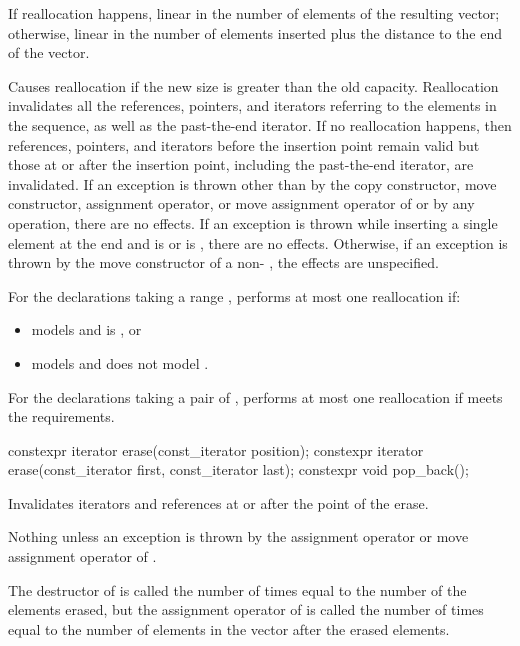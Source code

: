 \begin{itemdescr}
\pnum
\complexity
If reallocation happens,
linear in the number of elements of the resulting vector;
otherwise,
linear in the number of elements inserted plus the distance
to the end of the vector.

\pnum
\remarks
Causes reallocation if the new size is greater than the old capacity.
Reallocation invalidates all the references, pointers, and iterators
referring to the elements in the sequence, as well as the past-the-end iterator.
If no reallocation happens, then
references, pointers, and iterators
before the insertion point remain valid
but those at or after the insertion point,
including the past-the-end iterator,
are invalidated.
If an exception is thrown other than by
the copy constructor, move constructor,
assignment operator, or move assignment operator of
 or by any  operation,
there are no effects.
If an exception is thrown while inserting a single element at the end and
 is  or 
is , there are no effects.
Otherwise, if an exception is thrown by the move constructor of a non-
, the effects are unspecified.

\pnum
For the declarations taking a range ,
performs at most one reallocation if:
\begin{itemize}
\item
{} models  and
 is , or
\item
{} models  and
 does not model .
\end{itemize}
For the declarations taking a pair of ,
performs at most one reallocation if
 meets the  requirements.
\end{itemdescr}

%
\begin{itemdecl}
constexpr iterator erase(const_iterator position);
constexpr iterator erase(const_iterator first, const_iterator last);
constexpr void pop_back();
\end{itemdecl}

\begin{itemdescr}
\pnum
\effects
Invalidates iterators and references at or after the point of the erase.

\pnum
\throws
Nothing unless an exception is thrown by the
assignment operator or move assignment operator of
.

\pnum
\complexity
The destructor of  is called the number of times equal to the
number of the elements erased, but the assignment operator
of  is called the number of times equal to the number of
elements in the vector after the erased elements.
\end{itemdescr}

